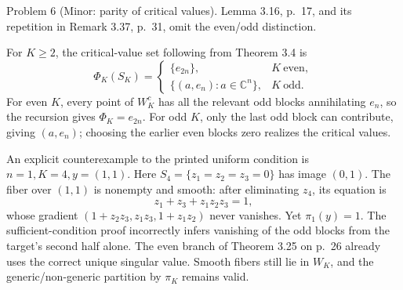 \documentclass[10pt]{article}
\begin{document}
Problem 6 (Minor: parity of critical values).  Lemma 3.16, p. 17, and its repetition in Remark 3.37, p. 31, omit the even/odd distinction.\par
For \(K\ge2\), the critical-value set following from Theorem 3.4 is \[\Phi_K(S_K)=
 \begin{cases}
 \{e_{2n}\},&K\ \text{even},\\
 \{(a,e_n):a\in\mathbb C^n\},&K\ \text{odd}.
 \end{cases}                                                   \tag{4}\] For even \(K\), every point of \(W_K^c\) has all the relevant odd blocks annihilating \(e_n\), so the recursion gives \(\Phi_K=e_{2n}\). For odd \(K\), only the last odd block can contribute, giving \((a,e_n)\); choosing the earlier even blocks zero realizes the critical values.\par
An explicit counterexample to the printed uniform condition is \(n=1,K=4,y=(1,1)\). Here \(S_4=\{z_1=z_2=z_3=0\}\) has image \((0,1)\). The fiber over \((1,1)\) is nonempty and smooth: after eliminating \(z_4\), its equation is \[z_1+z_3+z_1z_2z_3=1,\] whose gradient \((1+z_2z_3,z_1z_3,1+z_1z_2)\) never vanishes. Yet \(\pi_1(y)=1\). The sufficient-condition proof incorrectly infers vanishing of the odd blocks from the target’s second half alone. The even branch of Theorem 3.25 on p. 26 already uses the correct unique singular value. Smooth fibers still lie in \(W_K\), and the generic/non-generic partition by \(\pi_K\) remains valid.\par
\end{document}
